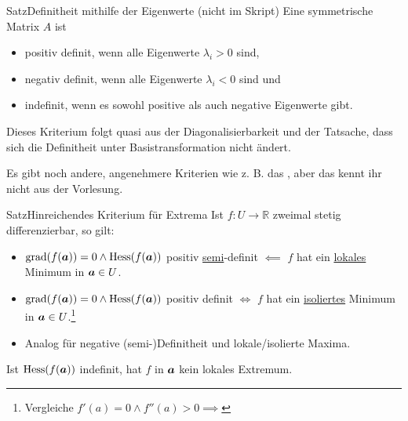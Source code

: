 \begin{Satz}
{Satz}{Definitheit mithilfe der Eigenwerte (nicht im Skript)}\label{satz:08DefinitheitEigenwerte}
Eine symmetrische Matrix $A$ ist
\begin{itemize}
    \item positiv definit, wenn alle Eigenwerte $\lambda_i>0$ sind,
    \item negativ definit, wenn alle Eigenwerte $\lambda_i<0$ sind und
    \item indefinit, wenn es sowohl positive als auch negative Eigenwerte gibt.
\end{itemize}
Dieses Kriterium folgt quasi aus der Diagonalisierbarkeit und der Tatsache, dass sich die Definitheit unter Basistransformation nicht ändert.
\end{Satz}
Es gibt noch andere, angenehmere Kriterien wie z. B. das , aber das kennt ihr nicht aus der Vorlesung.
\begin{Satz}
{Satz}{Hinreichendes Kriterium für Extrema}
Ist $f:U\to\mathbb{R}$ zweimal stetig differenzierbar, so gilt:
\begin{itemize}
    \item $\text{grad}(f({{\text{\boldmath${a}$}}}))=0\land \text{Hess}(f({{\text{\boldmath${a}$}}}))$ positiv \underline{semi}-definit $\impliedby$ $f$ hat ein \underline{lokales} Minimum in ${{\text{\boldmath${a}$}}}\in U$.
    \item $\text{grad}(f({{\text{\boldmath${a}$}}}))=0\land \text{Hess}(f({{\text{\boldmath${a}$}}}))$ positiv definit $\iff$ $f$ hat ein \underline{isoliertes} Minimum in ${{\text{\boldmath${a}$}}}\in U$.\footnote{Vergleiche $f'(a)=0\land f''(a)>0\implies $ \Smiley[1]}
    \item Analog für negative (semi-)Definitheit und lokale/isolierte Maxima.
\end{itemize}
Ist $\text{Hess} (f({{\text{\boldmath${a}$}}}))$ indefinit, hat $f$ in ${{\text{\boldmath${a}$}}}$ kein lokales Extremum.
\end{Satz}
